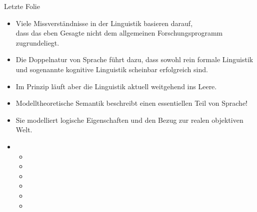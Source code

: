 \begin{frame}
  {Letzte Folie}
  \onslide<+->
  \begin{itemize}[<+->]
    \item Viele Missverständnisse in der Linguistik basieren darauf,\\
      dass das eben Gesagte nicht dem allgemeinen Forschungsprogramm zugrundeliegt.
    \item Die Doppelnatur von Sprache führt dazu, dass sowohl rein formale Linguistik\\
      und sogenannte kognitive Linguistik scheinbar erfolgreich sind.
    \item Im Prinzip läuft aber die Linguistik aktuell weitgehend ins Leere.
      \Halbzeile
    \item \alert{Modelltheoretische Semantik beschreibt einen essentiellen Teil von Sprache!}
    \item \alert{Sie modelliert logische Eigenschaften und den Bezug zur realen objektiven Welt.}
      \Halbzeile
    \item \small {}
      \begin{itemize}[<+->]
        \item {}
        \item {}
        \item {}
          \Viertelzeile
        \item {}
        \item {}
        \item {}
      \end{itemize}
  \end{itemize}
\end{frame}
